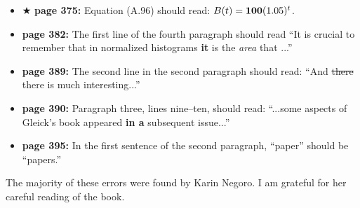 \documentclass[12pt]{article}
\begin{document}
\begin{itemize}
  \item $\bigstar$ {\bf page 375:}  Equation (A.96) should read: $B(t)
    = {\bf 100}(1.05)^t$.  

  \item {\bf page 382:}  The first line of the fourth paragraph should
    read ``It is crucial to remember that in normalized histograms
    {\bf it} is the {\em area}\/ that ...'' %

  \item {\bf page 389:} The second line in the second paragraph should
    read: ``And \sout{there} there is much interesting...''

  \item {\bf page 390:} Paragraph three, lines nine--ten, should read:
    ``...some aspects of Gleick's book appeared {\bf in a } subsequent
    issue...''  %

  \item {\bf page 395:} In the first sentence of the second paragraph,
    ``paper'' should be ``papers.''

\end{itemize}
\bigskip
The majority of these errors were found by Karin Negoro.  I am
grateful for her careful reading of the book. 
\end{document}
